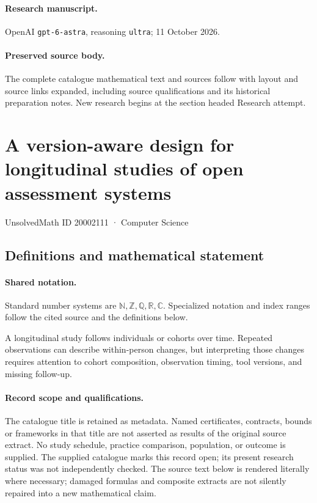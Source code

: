 \documentclass[11pt]{article}
\begin{document}
\paragraph{Research manuscript.} OpenAI \texttt{gpt-6-astra}, reasoning \texttt{ultra}; 11 October 2026.
\paragraph{Preserved source body.} The complete catalogue mathematical text and sources follow with layout and source links expanded, including source qualifications and its historical preparation notes. New research begins at the section headed Research attempt.

\section{A version-aware design for longitudinal studies of open assessment systems}\label{20002111}
{\small UnsolvedMath ID 20002111 · Computer Science}
\subsection{Definitions and mathematical statement}

\paragraph{Shared notation.}Standard number systems are $\mathbb N,\mathbb Z,\mathbb Q,\mathbb R,\mathbb C$. Specialized notation and index ranges follow the cited source and the definitions below.


A longitudinal study follows individuals or cohorts over time. Repeated observations can describe within-person changes, but interpreting those changes requires attention to cohort composition, observation timing, tool versions, and missing follow-up.
\paragraph{Record scope and qualifications.}
The catalogue title is retained as metadata. Named certificates, contracts, bounds or frameworks in that title are not asserted as results of the original source extract.
No study schedule, practice comparison, population, or outcome is supplied. The supplied catalogue marks this record open; its present research status was not independently checked.
The source text below is rendered literally where necessary; damaged formulas and composite extracts are not silently repaired into a new mathematical claim.
\end{document}

